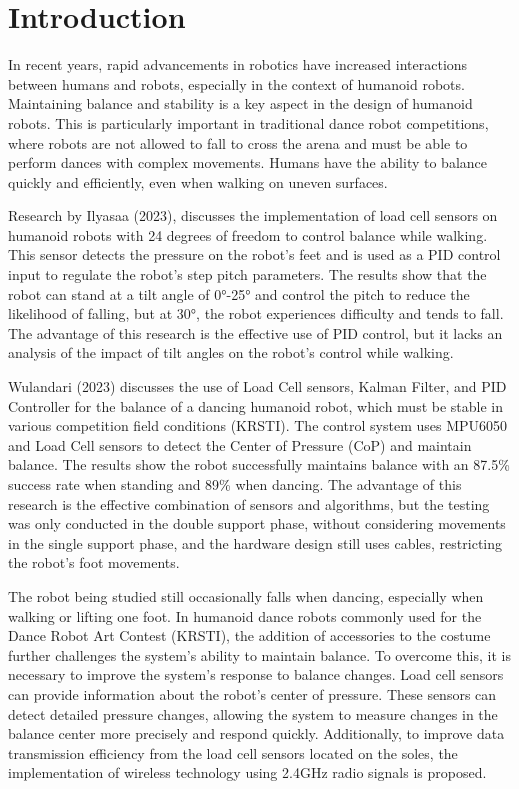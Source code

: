 \section{Introduction}
\label{sec:introduction}

In recent years, rapid advancements in robotics have increased interactions between humans and robots, especially in the context of humanoid robots. Maintaining balance and stability is a key aspect in the design of humanoid robots\cite{chiang2020posture}. This is particularly important in traditional dance robot competitions, where robots are not allowed to fall to cross the arena and must be able to perform dances with complex movements. Humans have the ability to balance quickly and efficiently, even when walking on uneven surfaces.

Research by Ilyasaa (2023)\cite{rotama}, discusses the implementation of load cell sensors on humanoid robots with 24 degrees of freedom to control balance while walking. This sensor detects the pressure on the robot's feet and is used as a PID control input to regulate the robot's step pitch parameters. The results show that the robot can stand at a tilt angle of 0°-25° and control the pitch to reduce the likelihood of falling, but at 30°, the robot experiences difficulty and tends to fall. The advantage of this research is the effective use of PID control, but it lacks an analysis of the impact of tilt angles on the robot's control while walking.

Wulandari (2023)\cite{lanangjagad} discusses the use of Load Cell sensors, Kalman Filter, and PID Controller for the balance of a dancing humanoid robot, which must be stable in various competition field conditions (KRSTI). The control system uses MPU6050 and Load Cell sensors to detect the Center of Pressure (CoP) and maintain balance. The results show the robot successfully maintains balance with an 87.5\% success rate when standing and 89\% when dancing. The advantage of this research is the effective combination of sensors and algorithms, but the testing was only conducted in the double support phase, without considering movements in the single support phase, and the hardware design still uses cables, restricting the robot's foot movements.

The robot being studied still occasionally falls when dancing, especially when walking or lifting one foot. In humanoid dance robots commonly used for the Dance Robot Art Contest (KRSTI), the addition of accessories to the costume further challenges the system's ability to maintain balance. To overcome this, it is necessary to improve the system's response to balance changes. Load cell sensors can provide information about the robot's center of pressure. These sensors can detect detailed pressure changes, allowing the system to measure changes in the balance center more precisely and respond quickly. Additionally, to improve data transmission efficiency from the load cell sensors located on the soles, the implementation of wireless technology using 2.4GHz radio signals is proposed.

